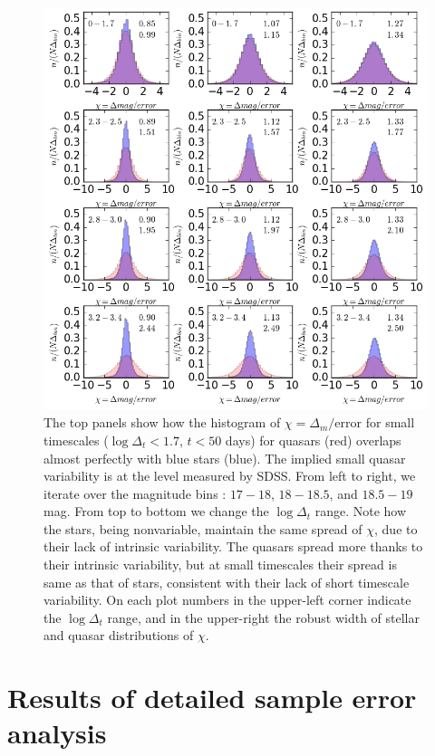 \documentclass[fleqn,usenatbib]{mnras}  %
\begin{document}
\begin{figure}
\label{fig:SF_panel}
\includegraphics[width=1.1\columnwidth]{Fig_3_histogram_panels_NEW.png}
 \caption{The top panels show how the histogram of  $\chi = \Delta_{m}/ \mathrm{error}$ for small 
timescales ($\log{\Delta_{t}} < 1.7$, $t<50$ days) for  quasars (red) overlaps almost perfectly with blue stars (blue). The  implied small quasar variability is at the level  measured by SDSS.  From left to right, we iterate over the  magnitude bins :  $17-18$,  $18-18.5$, and $18.5-19$ mag. From top to bottom we change the  $\log{\Delta_{t}}$  range. Note how  the  stars, being nonvariable, maintain the same spread of $\chi$, due to their lack of intrinsic variability. The quasars spread more thanks to their intrinsic variability, but at small timescales their spread is same as that of stars, consistent with their lack of short timescale variability. On each plot numbers in the upper-left corner indicate the $\log{\Delta_{t}}$ range, and in the upper-right the robust width of stellar and quasar distributions of $\chi$. }
\end{figure}

\section{Results of detailed sample error analysis}
\label{sec:err_analysis}
\end{document}
